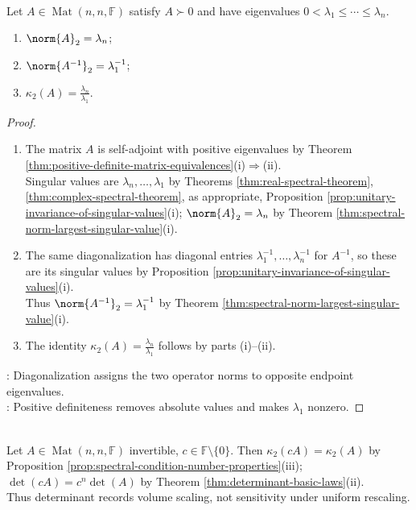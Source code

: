 \begin{corollary} \label{cor:positive-definite-condition-number-eigenvalues} \\
Let $A\in\operatorname{Mat}(n,n,\mathbb{F})$ satisfy $A\succ0$ and have eigenvalues $0<\lambda_1\leq\cdots\leq\lambda_n$.
\begin{enumerate}[label=(\roman*)]
\setlength{\itemsep}{0pt}
\item $\norm{A}_2=\lambda_n$;
\item $\norm{A^{-1}}_2=\lambda_1^{-1}$;
\item $\kappa_2(A)=\frac{\lambda_n}{\lambda_1}$.
\end{enumerate}
\begin{proof}
\begin{enumerate}[label=(\roman*)]
\setlength{\itemsep}{0pt}
\item[$(i)$] The matrix $A$ is self-adjoint with positive eigenvalues by Theorem \ref{thm:positive-definite-matrix-equivalences}(i)$\Rightarrow$(ii).\\
Singular values are $\lambda_n,\ldots,\lambda_1$ by Theorems \ref{thm:real-spectral-theorem}, \ref{thm:complex-spectral-theorem}, as appropriate, Proposition \ref{prop:unitary-invariance-of-singular-values}(i); $\norm{A}_2=\lambda_n$ by Theorem \ref{thm:spectral-norm-largest-singular-value}(i).
\item[$(ii)$] The same diagonalization has diagonal entries $\lambda_1^{-1},\ldots,\lambda_n^{-1}$ for $A^{-1}$, so these are its singular values by Proposition \ref{prop:unitary-invariance-of-singular-values}(i).\\
Thus $\norm{A^{-1}}_2=\lambda_1^{-1}$ by Theorem \ref{thm:spectral-norm-largest-singular-value}(i).
\item[$(iii)$] The identity $\kappa_2(A)=\frac{\lambda_n}{\lambda_1}$ follows by parts (i)--(ii).
\end{enumerate}
: Diagonalization assigns the two operator norms to opposite endpoint eigenvalues.\\
: Positive definiteness removes absolute values and makes $\lambda_1$ nonzero.
\end{proof}
\end{corollary}

\begin{perspective} \label{per:determinant-is-not-conditioning} \\
Let $A\in\operatorname{Mat}(n,n,\mathbb{F})$ invertible, $c\in\mathbb{F}\setminus\{0\}$. Then $\kappa_2(cA)=\kappa_2(A)$ by Proposition \ref{prop:spectral-condition-number-properties}(iii); $\det(cA)=c^n\det(A)$ by Theorem \ref{thm:determinant-basic-laws}(ii).\\
Thus determinant records volume scaling, not sensitivity under uniform rescaling.
\end{perspective}

